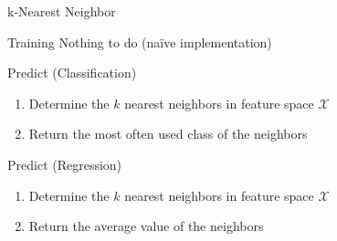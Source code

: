 \begin{frame}[c]{k-Nearest Neighbor}

\begin{block}{Training}
Nothing to do (na\"ive implementation)
\end{block}

\bigskip

\begin{block}{Predict (Classification)}
\begin{enumerate}
  \item Determine the $k$ nearest neighbors in feature space $\mathcal{X}$
  \item Return the most often used class of the neighbors
\end{enumerate}
\end{block}

\pause
\begin{block}{Predict (Regression)}
\begin{enumerate}
  \item Determine the $k$ nearest neighbors in feature space $\mathcal{X}$
  \item Return the average value of the neighbors
\end{enumerate}
\end{block}

\end{frame}
